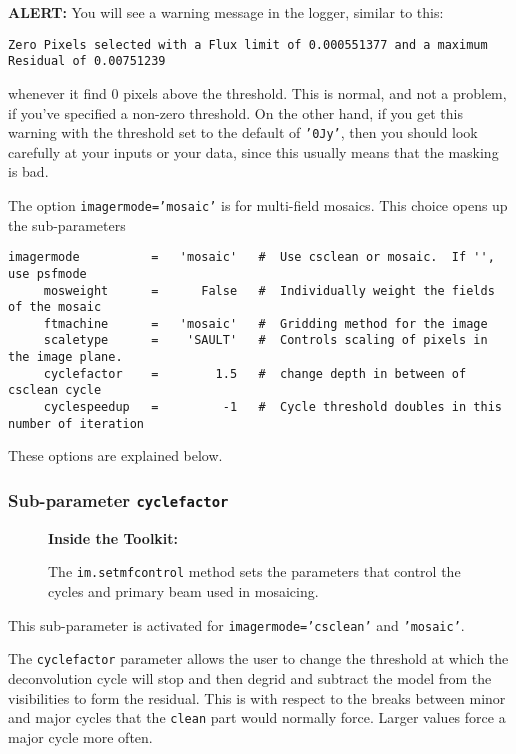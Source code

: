 {\bf ALERT:} You will see a warning message in the logger, 
similar to this:
\small
\begin{verbatim}
Zero Pixels selected with a Flux limit of 0.000551377 and a maximum Residual of 0.00751239
\end{verbatim}
\normalsize
whenever it find 0 pixels above the threshold.  This is normal,
and not a problem, if you've specified a non-zero threshold.
On the other hand, if you get this warning with the threshold set to
the default of {\tt '0Jy'}, then you should look carefully at your
inputs or your data, since this usually means that the masking is bad.

The option {\tt imagermode='mosaic'} is for multi-field mosaics.  This
choice opens up the sub-parameters 
\small
\begin{verbatim}
imagermode          =   'mosaic'   #  Use csclean or mosaic.  If '', use psfmode
     mosweight      =      False   #  Individually weight the fields of the mosaic
     ftmachine      =   'mosaic'   #  Gridding method for the image
     scaletype      =    'SAULT'   #  Controls scaling of pixels in the image plane.
     cyclefactor    =        1.5   #  change depth in between of  csclean cycle
     cyclespeedup   =         -1   #  Cycle threshold doubles in this number of iteration
\end{verbatim}
\normalsize
These options are explained below.

\subsubsection{Sub-parameter {\tt cyclefactor} }
\label{section:im.clean.imagermode.cyclefactor}

\begin{wrapfigure}{r}{2.5in}
  \begin{boxedminipage}{2.5in}
     \centerline{\bf Inside the Toolkit:}
     The {\tt im.setmfcontrol} method sets the parameters that control
     the cycles and primary beam used in mosaicing.
  \end{boxedminipage}
\end{wrapfigure}

This sub-parameter is activated for {\tt imagermode='csclean'} and
{\tt 'mosaic'}.

The {\tt cyclefactor} parameter allows the user to change the
threshold at which the deconvolution cycle will stop and then degrid and
subtract the model from the visibilities to form the residual. This is
with respect to the breaks between minor and major cycles that the
{\tt clean} part would normally force.  Larger values force a major
cycle more often.  

